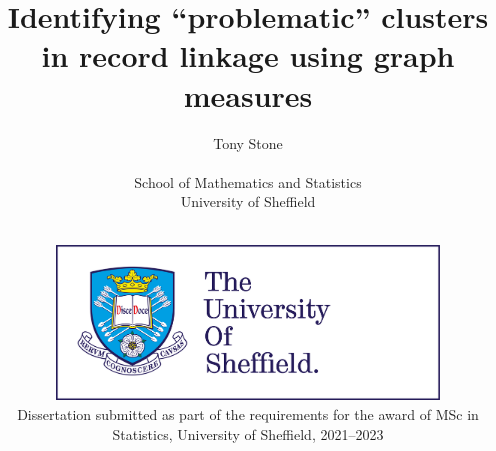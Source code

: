 


\title{Identifying “problematic” clusters in record linkage using graph measures}
\author{Tony Stone
\\$~$\vspace{0.5in}\\
School of Mathematics and Statistics\\
University of Sheffield}

\date{$~$\vspace{1.5in}\\
\includegraphics[width=4in]{figures/logo.jpg}\\
\vfill Dissertation submitted as part of the requirements for the award of MSc in Statistics, University of Sheffield, 2021--2023\\
}

\maketitle
